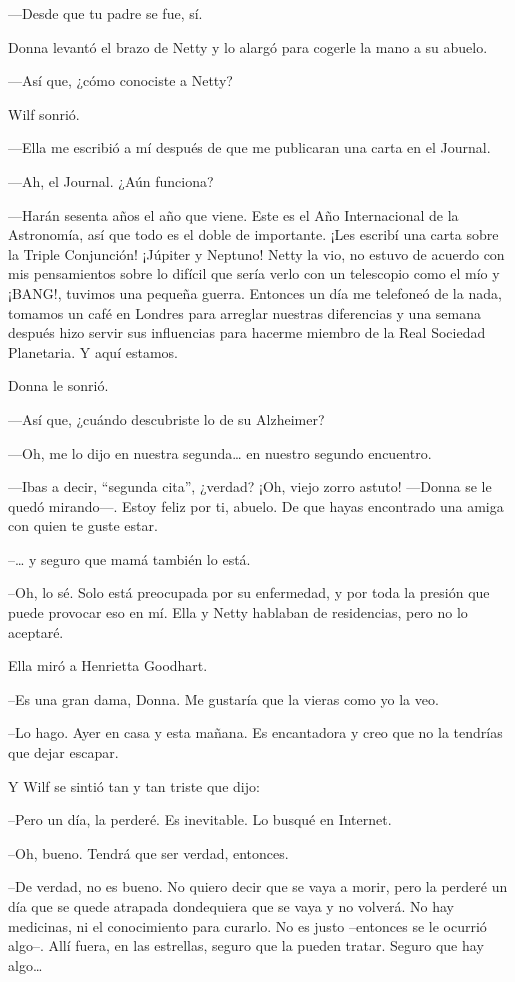 ---Desde que tu padre se fue, sí.

Donna levantó el brazo de Netty y lo alargó para cogerle la mano a su
abuelo.

---Así que, ¿cómo conociste a Netty?

Wilf sonrió.

---Ella me escribió a mí después de que me publicaran una carta en el
Journal.

---Ah, el Journal. ¿Aún funciona?

---Harán sesenta años el año que viene. Este es el Año Internacional de
la Astronomía, así que todo es el doble de importante. ¡Les escribí una
carta sobre la Triple Conjunción! ¡Júpiter y Neptuno! Netty la vio, no
estuvo de acuerdo con mis pensamientos sobre lo difícil que sería verlo
con un telescopio como el mío y ¡BANG!, tuvimos una pequeña guerra.
Entonces un día me telefoneó de la nada, tomamos un café en Londres para
arreglar nuestras diferencias y una semana después hizo servir sus
influencias para hacerme miembro de la Real Sociedad Planetaria. Y aquí
estamos.

Donna le sonrió.

---Así que, ¿cuándo descubriste lo de su Alzheimer?

---Oh, me lo dijo en nuestra segunda\ldots{} en nuestro segundo
encuentro.

---Ibas a decir, ``segunda cita'', ¿verdad? ¡Oh, viejo zorro astuto!
---Donna se le quedó mirando---. Estoy feliz por ti, abuelo. De que
hayas encontrado una amiga con quien te guste estar.

--\ldots{} y seguro que mamá también lo está.

--Oh, lo sé. Solo está preocupada por su enfermedad, y por  toda la
presión que puede provocar eso en mí. Ella y Netty hablaban de
residencias, pero no lo aceptaré.

Ella miró a Henrietta Goodhart.

--Es una gran dama, Donna. Me gustaría que la vieras como yo la veo.

--Lo hago. Ayer en casa y esta mañana. Es encantadora y creo que no la
tendrías que dejar escapar.

Y Wilf se sintió tan y tan triste que dijo:

--Pero un día, la perderé. Es inevitable. Lo busqué en Internet.

--Oh, bueno. Tendrá que ser verdad, entonces.

--De verdad, no es bueno. No quiero decir que se vaya a morir, pero la
perderé un día que se quede atrapada dondequiera que se vaya y no
volverá. No hay medicinas, ni el conocimiento para curarlo. No es justo
--entonces se le ocurrió algo--. Allí fuera, en las estrellas, seguro
que la pueden tratar. Seguro que hay algo\ldots{}

